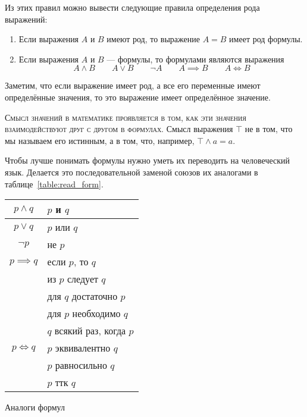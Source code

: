 Из этих правил можно вывести следующие правила определения рода выражений:
\begin{enumerate}
	\item{}Если выражения $A$ и $B$ имеют род,
	то выражение $A=B$ имеет род формулы.

	\item{}Если выражения $A$ и $B$ --- формулы, то формулами являются выражения
	\[
		A\land B\qquad A\lor B\qquad \lnot A\qquad A\implies B\qquad A\iff B
	\]
\end{enumerate}

Заметим, что если выражение имеет род, а все его переменные
имеют определённые значения, то это выражение имеет определённое значение.

\textsc{Смысл значений в математике проявляется в том,
	как эти значения взаимодействуют
	друг с другом в формулах.}
Смысл выражения $\top$ не в том, что мы называем его истинным,
а в том, что, например, $\top\land a=a$.


Чтобы лучше понимать формулы нужно уметь их переводить на человеческий язык. Делается
это последовательной заменой союзов их аналогами в таблице~\ref{table:read_form}.
\begin{margintable}
	\begin{tabular}{cl}
		$p\land q$    & $p$ и $q$                 \\\hline
		$p\lor q$     & $p$ или $q$               \\\hline
		$\lnot p$     & не $p$                    \\\hline
		$p\implies q$ & если $p$, то $q$          \\
		              & из $p$ следует $q$        \\
		              & для $q$ достаточно $p$    \\
		              & для $p$ необходимо $q$    \\
		              & $q$ всякий раз, когда $p$ \\\hline
		$p\iff q$     & $p$ эквивалентно $q$      \\
		              & $p$ равносильно $q$       \\
		              & $p$ ттк $q$
	\end{tabular}
	\caption{Аналоги формул}\label{table:read_form}
\end{margintable}

